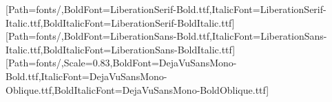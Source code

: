 \usepackage[a4paper,margin=24mm,headheight=15pt]{geometry}
\usepackage{fontspec}
\setmainfont{LiberationSerif-Regular.ttf}[Path=fonts/,BoldFont=LiberationSerif-Bold.ttf,ItalicFont=LiberationSerif-Italic.ttf,BoldItalicFont=LiberationSerif-BoldItalic.ttf]
\setsansfont{LiberationSans-Regular.ttf}[Path=fonts/,BoldFont=LiberationSans-Bold.ttf,ItalicFont=LiberationSans-Italic.ttf,BoldItalicFont=LiberationSans-BoldItalic.ttf]
\setmonofont{DejaVuSansMono.ttf}[Path=fonts/,Scale=0.83,BoldFont=DejaVuSansMono-Bold.ttf,ItalicFont=DejaVuSansMono-Oblique.ttf,BoldItalicFont=DejaVuSansMono-BoldOblique.ttf]
\usepackage{polyglossia}
\usepackage{amsmath,amssymb,booktabs,longtable,array,graphicx,xcolor}
\usepackage[font=small,labelfont=bf]{caption}
\usepackage{microtype}
\usepackage{placeins}
\usepackage{enumitem}
\usepackage[numbers,sort&compress]{natbib}
\usepackage[unicode,colorlinks=true,linkcolor=blue!45!black,citecolor=blue!45!black,urlcolor=blue!45!black]{hyperref}
\usepackage{xurl}
\usepackage{fancyhdr}
\pagestyle{fancy}\fancyhf{}\fancyfoot[C]{\thepage}
\setlength{\parindent}{1.25em}\setlength{\parskip}{2pt}\setlength{\emergencystretch}{2em}
\linespread{1.06}
\graphicspath{{figures/}}
\newcommand{\code}[1]{\nolinkurl{#1}}
\newcommand{\CI}[3]{#1\,[#2,\,#3]}

